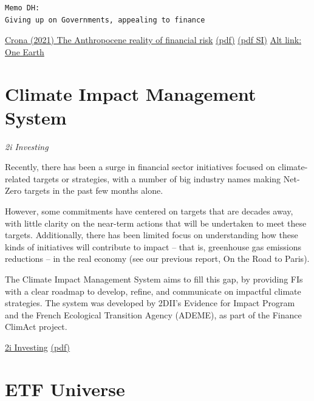 \documentclass[
]{book}
\begin{document}
\begin{verbatim}
Memo DH:
Giving up on Governments, appealing to finance
\end{verbatim}

\href{https://www.sciencedirect.com/science/article/pii/S2590332221002359\#undfig1}{Crona (2021) The Anthropocene reality of financial risk}
\href{pdf/Crona_2021_Anthropocene_reality_of\%20Financial_Risk.pdf}{(pdf)}
\href{pdf/Crona_2021_Anthropocene_reality_of\%20Financial_Risk_SI.pdf}{(pdf SI)}
\href{https://www.cell.com/one-earth/fulltext/S2590-3322(21)00235-9?_returnURL=https\%3A\%2F\%2Flinkinghub.elsevier.com\%2Fretrieve\%2Fpii\%2FS2590332221002359\%3Fshowall\%3Dtrue}{Alt link: One Earth}

\hypertarget{climate-impact-management-system}{%
\section{Climate Impact Management System}\label{climate-impact-management-system}}

\emph{2i Investing}

Recently, there has been a surge in financial sector initiatives focused on climate-related targets or strategies, with a number of big industry names making Net-Zero targets in the past few months alone.

However, some commitments have centered on targets that are decades away, with little clarity on the near-term actions that will be undertaken to meet these targets. Additionally, there has been limited focus on understanding how these kinds of initiatives will contribute to impact -- that is, greenhouse gas emissions reductions -- in the real economy (see our previous report, On the Road to Paris).

The Climate Impact Management System aims to fill this gap, by providing FIs with a clear roadmap to develop, refine, and communicate on impactful climate strategies. The system was developed by 2DII's Evidence for Impact Program and the French Ecological Transition Agency (ADEME), as part of the Finance ClimAct project.

\href{https://2degrees-investing.org/new-climate-impact-management-system-opens-for-consultation/}{2i Investing}
\href{pdf/Climate-Impact-Mgmt-System.pdf}{(pdf)}

\hypertarget{etf-universe}{%
\section{ETF Universe}\label{etf-universe}}
\end{document}
